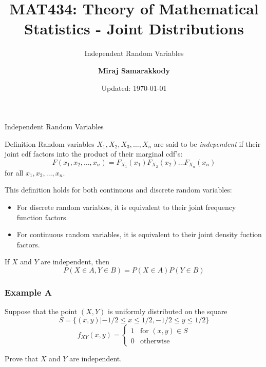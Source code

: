 \documentclass{beamer}
\title{MAT434: Theory of Mathematical Statistics - Joint Distributions}
\subtitle{Independent Random Variables \cite{RJA2006}}
\author{\textbf{Miraj Samarakkody}}
\institute{Tougaloo College}
\date{Updated: \today}
\begin{document}
\begin{frame}
    \titlepage
\end{frame}




\begin{frame}{Independent Random Variables}
    \begin{block}{Definition}
        Random variables \(X_1,X_2, X_3, \dots, X_n\) are said to be \textit{independent} if their joint cdf factors into the product of their marginal cdf's:
        \[F(x_1, x_2, \dots, x_n)= F_{X_1}(x_1)F_{X_2}(x_2)\dots F_{X_n}(x_n)\] for all \(x_1, x_2, \dots, x_n\). 
    \end{block}\pause
    \vspace{0.5cm}  

    This definition holds for both continuous and discrete random variables:\pause
    \begin{itemize}
        \item For discrete random variables, it is equivalent to their joint frequency function factors.\pause
        \item For continuous random variables, it is equivalent to their joint density fuction factors. 
    \end{itemize}
\end{frame}

\begin{frame}{}
    If \(X\) and \(Y\) are independent, then \[P(X \in A, Y \in B) = P(X \in A)P(Y \in B)\]
\end{frame}

\begin{frame}
    \frametitle{Example A}

    Suppose that the point \((X,Y)\) is uniformly distributed on the square 
    \[S= \{(x,y)| -1/2 \leq x \leq 1/2, -1/2 \leq y \leq 1/2\}\]
    \[f_{XY}(x,y)=\begin{cases}
        1 & \text{for } (x,y) \in S\\
        0 & \text{otherwise}
    \end{cases}\]
    
    Prove that \(X\) and \(Y\) are independent.

\end{frame}
\end{document}
